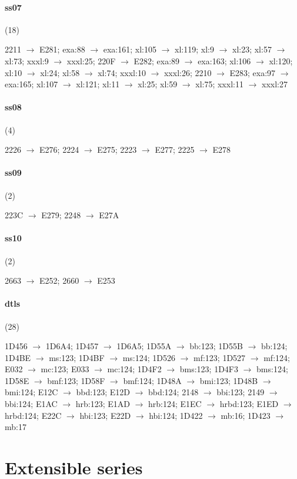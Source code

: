 \paragraph{ss07} (18)
\raggedright\small 2211 $\to$ E281; exa:88 $\to$ exa:161; xl:105 $\to$ xl:119;
xl:9 $\to$ xl:23; xl:57 $\to$ xl:73; xxxl:9 $\to$ xxxl:25; 220F $\to$ E282;
exa:89 $\to$ exa:163; xl:106 $\to$ xl:120; xl:10 $\to$ xl:24; xl:58 $\to$
xl:74; xxxl:10 $\to$ xxxl:26; 2210 $\to$ E283; exa:97 $\to$ exa:165; xl:107
$\to$ xl:121; xl:11 $\to$ xl:25; xl:59 $\to$ xl:75; xxxl:11 $\to$ xxxl:27\par

\paragraph{ss08} (4)
\raggedright\small 2226 $\to$ E276; 2224 $\to$ E275; 2223 $\to$ E277; 2225
$\to$ E278\par

\paragraph{ss09} (2)
\raggedright\small 223C $\to$ E279; 2248 $\to$ E27A\par

\paragraph{ss10} (2)
\raggedright\small 2663 $\to$ E252; 2660 $\to$ E253\par

\paragraph{dtls} (28)
\raggedright\small 1D456 $\to$ 1D6A4; 1D457 $\to$ 1D6A5; 1D55A $\to$ bb:123;
1D55B $\to$ bb:124; 1D4BE $\to$ ms:123; 1D4BF $\to$ ms:124; 1D526 $\to$ mf:123;
1D527 $\to$ mf:124; E032 $\to$ mc:123; E033 $\to$ mc:124; 1D4F2 $\to$ bms:123;
1D4F3 $\to$ bms:124; 1D58E $\to$ bmf:123; 1D58F $\to$ bmf:124; 1D48A $\to$
bmi:123; 1D48B $\to$ bmi:124; E12C $\to$ bbd:123; E12D $\to$ bbd:124; 2148
$\to$ bbi:123; 2149 $\to$ bbi:124; E1AC $\to$ hrb:123; E1AD $\to$ hrb:124; E1EC
$\to$ hrbd:123; E1ED $\to$ hrbd:124; E22C $\to$ hbi:123; E22D $\to$ hbi:124;
1D422 $\to$ mb:16; 1D423 $\to$ mb:17\par

\section{Extensible series}\label{app:stretch}

